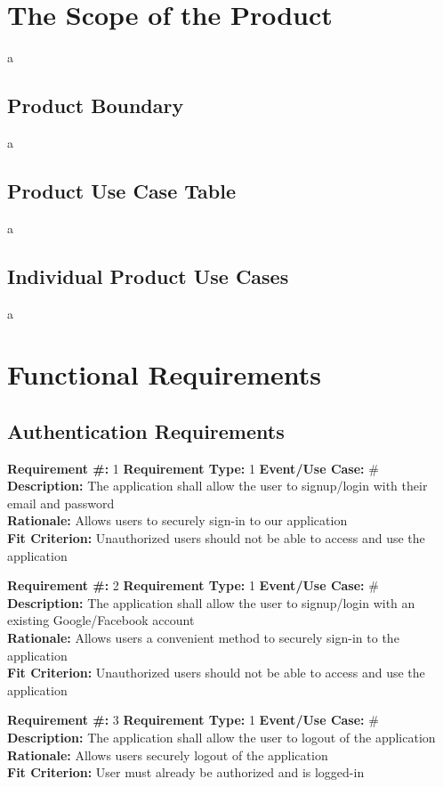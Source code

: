 \documentclass[12pt]{article}
\begin{document}
\section{The Scope of the Product}
a

\subsection{Product Boundary}
a

\subsection{Product Use Case Table}
a

\subsection{Individual Product Use Cases}
a

\section{Functional Requirements}
\noindent

\subsection{Authentication Requirements} 
\noindent

\textbf{Requirement \#:} 1 \quad \textbf{Requirement Type:} 1 \quad \textbf{Event/Use Case:} \#
\medskip
\\\textbf{Description:} The application shall allow the user to signup/login with their email and password
\\\textbf{Rationale:} Allows users to securely sign-in to our application
\\\textbf{Fit Criterion:} Unauthorized users should not be able to access and use the application

\bigskip
\textbf{Requirement \#:} 2 \quad \textbf{Requirement Type:} 1 \quad \textbf{Event/Use Case:} \#
\medskip
\\\textbf{Description:} The application shall allow the user to signup/login with an existing Google/Facebook account
\\\textbf{Rationale:} Allows users a convenient method to securely sign-in to the application 
\\\textbf{Fit Criterion:} Unauthorized users should not be able to access and use the application

\bigskip
\textbf{Requirement \#:} 3 \quad \textbf{Requirement Type:} 1 \quad \textbf{Event/Use Case:} \#
\medskip
\\\textbf{Description:} The application shall allow the user to logout of the application 
\\\textbf{Rationale:} Allows users securely logout of the application 
\\\textbf{Fit Criterion:} User must already be authorized and is logged-in
\end{document}
